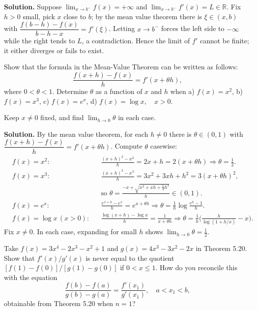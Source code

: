 \noindent\textbf{Solution.}
Suppose $\lim_{x\to b^-}f(x)=+\infty$ and $\lim_{x\to b^-}f'(x)=L\in\mathbb{R}$. Fix $h>0$ small, pick $x$ close to $b$; by the mean value theorem there is $\xi\in(x,b)$ with $\dfrac{f(b-h)-f(x)}{b-h-x}=f'(\xi)$. Letting $x\to b^-$ forces the left side to $-\infty$ while the right tends to $L$, a contradiction. Hence the limit of $f'$ cannot be finite; it either diverges or fails to exist.

\begin{problembox}
Show that the formula in the Mean-Value Theorem can be written as follows:
\[ \frac{f(x+h)-f(x)}{h} = f'(x+\theta h), \]
where \( 0 < \theta < 1 \). Determine \( \theta \) as a function of \( x \) and \( h \) when 
a) \( f(x) = x^2 \), 
b) \( f(x) = x^3 \), 
c) \( f(x) = e^x \), 
d) \( f(x) = \log x, \quad x > 0 \).

Keep \( x \neq 0 \) fixed, and find \( \lim_{h \to 0} \theta \) in each case.
\end{problembox}

\noindent\textbf{Solution.}
By the mean value theorem, for each $h\ne 0$ there is $\theta\in(0,1)$ with $\dfrac{f(x+h)-f(x)}{h}=f'(x+\theta h)$. Compute $\theta$ casewise:
\[\begin{aligned}
&f(x)=x^2:&&\frac{(x+h)^2-x^2}{h}=2x+h=2(x+\theta h)\Rightarrow\theta=\tfrac12.\\
&f(x)=x^3:&&\frac{(x+h)^3-x^3}{h}=3x^2+3xh+h^2=3(x+\theta h)^2,\\
&&&\text{so }\theta=\frac{-x+\sqrt{x^2+xh+\tfrac13 h^2}}{h}\in(0,1).\\
&f(x)=e^x:&&\frac{e^{x+h}-e^x}{h}=e^{x+\theta h}\Rightarrow \theta=\frac1h\log\frac{e^h-1}{h}.\\
&f(x)=\log x\,(x>0):&&\frac{\log(x+h)-\log x}{h}=\frac{1}{x+\theta h}\Rightarrow \theta=\frac{1}{h}\Big(\frac{h}{\log(1+h/x)}-x\Big).
\end{aligned}\]
Fix $x\ne 0$. In each case, expanding for small $h$ shows $\lim_{h\to 0}\theta=\tfrac12$.

\begin{problembox}
Take \( f(x) = 3x^4 - 2x^3 - x^2 + 1 \) and \( g(x) = 4x^3 - 3x^2 - 2x \) in Theorem 5.20. Show that \( f'(x)/g'(x) \) is never equal to the quotient \( [f(1) - f(0)]/[g(1) - g(0)] \) if \( 0 < x \leq 1 \). How do you reconcile this with the equation
\[ \frac{f(b) - f(a)}{g(b) - g(a)} = \frac{f'(x_1)}{g'(x_1)}, \quad a < x_1 < b, \]
obtainable from Theorem 5.20 when \( n = 1 \)?
\end{problembox}

